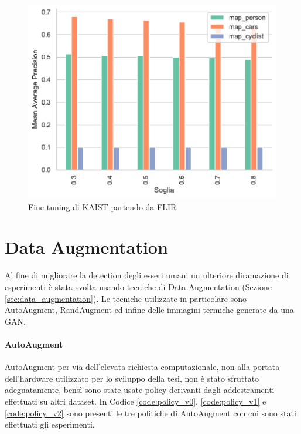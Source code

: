 \begin{figure}[]
    \centering
    \includegraphics[width=\textwidth]{images/graphic/graphics_map.pdf}
    \caption{Fine tuning di KAIST partendo da FLIR}
    \label{fig:test_kaist_ep8_map}
\end{figure}

\section{Data Augmentation}
\label{sec:data_augmentaion_experiment}
Al fine di migliorare la detection degli esseri umani un ulteriore diramazione di esperimenti è stata svolta usando tecniche di Data Augmentation (Sezione \ref{sec:data_augmentation}). Le tecniche utilizzate in particolare sono AutoAugment, RandAugment ed infine delle immagini termiche generate da una \ac{GAN}. 
\paragraph{AutoAugment}
AutoAugment per via dell'elevata richiesta computazionale, non alla portata dell'hardware utilizzato per lo sviluppo della tesi, non è stato sfruttato adeguatamente, bensì sono state usate policy derivanti dagli addestramenti effettuati su altri dataset. In Codice \ref{code:policy_v0}, \ref{code:policy_v1} e \ref{code:policy_v2} sono presenti le tre politiche di AutoAugment con cui sono stati effettuati gli esperimenti.  

